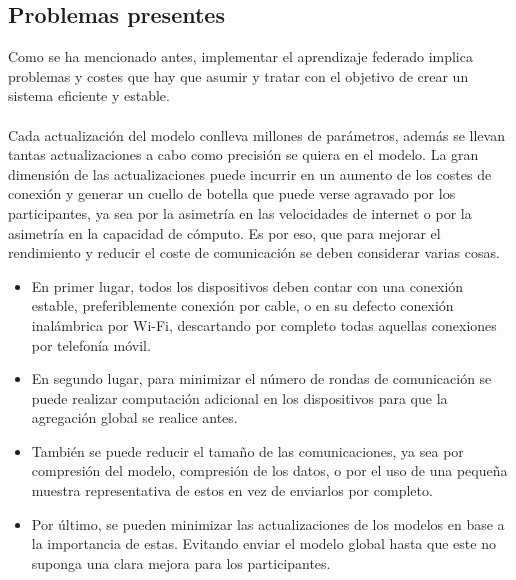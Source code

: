 \subsection{Problemas presentes}
Como se ha mencionado antes, implementar el aprendizaje federado implica problemas y costes que hay que asumir y tratar con el objetivo de crear un sistema eficiente y estable. 
\\ \\
Cada actualización del modelo conlleva millones de parámetros, además se llevan tantas actualizaciones a cabo como precisión se quiera en el modelo. La gran dimensión de las actualizaciones puede incurrir en un aumento de los costes de conexión y generar un cuello de botella que puede verse agravado por los participantes, ya sea por la asimetría en las velocidades de internet o por la asimetría en la capacidad de cómputo. Es por eso, que para mejorar el rendimiento y reducir el coste de comunicación se deben considerar varias cosas.
\begin{itemize}
    \item En primer lugar, todos los dispositivos deben contar con una conexión estable, preferiblemente conexión por cable, o en su defecto conexión inalámbrica por Wi-Fi, descartando por completo todas aquellas conexiones por telefonía móvil.
    \item En segundo lugar, para minimizar el número de rondas de comunicación se puede realizar computación adicional en los dispositivos para que la agregación global se realice antes.
    \item También se puede reducir el tamaño de las comunicaciones, ya sea por compresión del modelo, compresión de los datos, o por el uso de una pequeña muestra representativa de estos en vez de enviarlos por completo.
    \item Por último, se pueden minimizar las actualizaciones de los modelos en base a la importancia de estas. Evitando enviar el modelo global hasta que este no suponga una clara mejora para los participantes.
\end{itemize}
